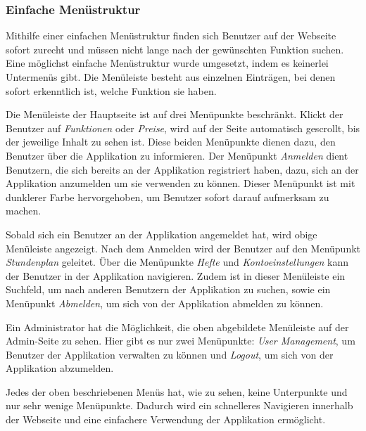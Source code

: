 \subsubsection{Einfache Menüstruktur}
Mithilfe einer einfachen Menüstruktur finden sich Benutzer auf der Webseite sofort zurecht und müssen nicht lange nach der gewünschten Funktion suchen. Eine möglichst einfache Menüstruktur wurde umgesetzt, indem es keinerlei Untermenüs gibt. Die Menüleiste besteht aus einzelnen Einträgen, bei denen sofort erkenntlich ist, welche Funktion sie haben.\\


Die Menüleiste der Hauptseite ist auf drei Menüpunkte beschränkt. Klickt der Benutzer auf \textit{Funktionen} oder \textit{Preise}, wird auf der Seite automatisch gescrollt, bis der jeweilige Inhalt zu sehen ist. Diese beiden Menüpunkte dienen dazu, den Benutzer über die Applikation zu informieren. Der Menüpunkt \textit{Anmelden} dient Benutzern, die sich bereits an der Applikation registriert haben, dazu, sich an der Applikation anzumelden um sie verwenden zu können. Dieser Menüpunkt ist mit dunklerer Farbe hervorgehoben, um Benutzer sofort darauf aufmerksam zu machen.

\newpage


Sobald sich ein Benutzer an der Applikation angemeldet hat, wird obige Menüleiste angezeigt. Nach dem Anmelden wird der Benutzer auf den Menüpunkt \textit{Stundenplan} geleitet. Über die Menüpunkte \textit{Hefte} und \textit{Kontoeinstellungen} kann der Benutzer in der Applikation navigieren. Zudem ist in dieser Menüleiste ein Suchfeld, um nach anderen Benutzern der Applikation zu suchen, sowie ein Menüpunkt \textit{Abmelden}, um sich von der Applikation abmelden zu können.


Ein Administrator hat die Möglichkeit, die oben abgebildete Menüleiste auf der Admin-Seite zu sehen. Hier gibt es nur zwei Menüpunkte: \textit{User Management}, um Benutzer der Applikation verwalten zu können und \textit{Logout}, um sich von der Applikation abzumelden.

Jedes der oben beschriebenen Menüs hat, wie zu sehen, keine Unterpunkte und nur sehr wenige Menüpunkte. Dadurch wird ein schnelleres Navigieren innerhalb der Webseite und eine einfachere Verwendung der Applikation ermöglicht.

